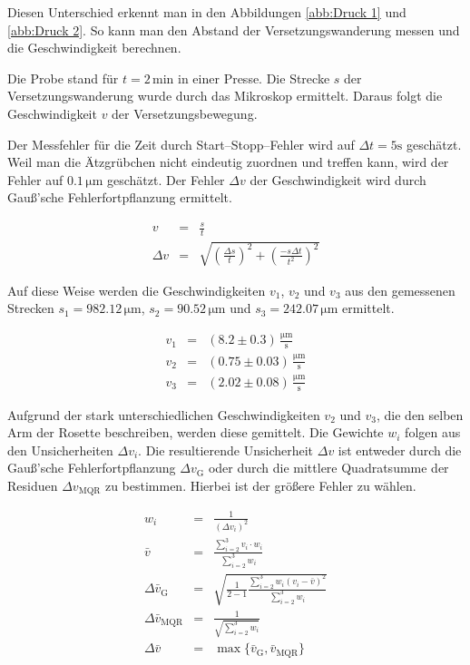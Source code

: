\documentclass[12pt,a4paper]{scrartcl}
\numberwithin{equation}{section} %
\begin{document}
Diesen Unterschied erkennt man in den Abbildungen \ref{abb:Druck 1} und \ref{abb:Druck 2}. So kann man den Abstand der Versetzungswanderung messen und die Geschwindigkeit berechnen.

Die Probe stand für $t=2\mathrm{\,min}$ in einer Presse. Die Strecke $s$ der Versetzungswanderung wurde durch das Mikroskop ermittelt. Daraus folgt die Geschwindigkeit $v$ der Versetzungsbewegung.

Der Messfehler für die Zeit durch Start--Stopp--Fehler wird auf $\Delta t=5\mathrm s$ geschätzt. Weil man die Ätzgrübchen nicht eindeutig zuordnen und treffen kann, wird der Fehler auf $0.1\mathrm{\,\mu m}$ geschätzt. Der Fehler $\Delta v$ der Geschwindigkeit wird durch Gauß'sche Fehlerfortpflanzung ermittelt.

\begin{eqnarray}
    v &=& \frac{s}{t} \\
    \Delta v &=&
        \sqrt{
            \left(\frac{\Delta s}{t}\right)^2
            + \left(\frac{-s \Delta t}{t^2}\right)^2
        }
\end{eqnarray}

\noindent
Auf diese Weise werden die Geschwindigkeiten $v_1$, $v_2$ und $v_3$ aus den gemessenen Strecken $s_1=982.12\mathrm{\,\mu m}$, $s_2=90.52\mathrm{\,\mu m}$ und $s_3=242.07\mathrm{\,\mu m}$ ermittelt.

\begin{eqnarray}
    v_1 &=& (8.2 \pm 0.3) \mathrm{\,\frac{\mu m}{s}} \\
    v_2 &=& (0.75 \pm 0.03) \mathrm{\,\frac{\mu m}{s}} \\
    v_3 &=& (2.02 \pm 0.08) \mathrm{\,\frac{\mu m}{s}}
\end{eqnarray}

\noindent
Aufgrund der stark unterschiedlichen Geschwindigkeiten $v_2$ und $v_3$, die den selben Arm der Rosette beschreiben, werden diese gemittelt. Die Gewichte $w_i$ folgen aus den Unsicherheiten $\Delta v_i$. Die resultierende Unsicherheit $\Delta v$ ist entweder durch die Gauß'sche Fehlerfortpflanzung $\Delta v_\mathrm{G}$ oder durch die mittlere Quadratsumme der Residuen $\Delta v_\mathrm{MQR}$ zu bestimmen. Hierbei ist der größere Fehler zu wählen.

\begin{eqnarray}
    w_i &=& \frac{1}{(\Delta v_i)^2} \\
    \bar{v} &=& \frac{\sum_{i=2}^{3} v_i\cdot w_i}{\sum_{i=2}^{3} w_i} \\
    \Delta \bar{v}_\mathrm{G} &=&
        \sqrt{\frac{1}{2-1}\frac{\sum_{i=2}^{3}w_i(v_i-\bar{v})^2}{\sum_{i=2}^{3}w_i}} \\
    \Delta \bar{v}_\mathrm{MQR} & = & \frac{1}{\sqrt{\sum_{i=2}^{3}w_i}} \\
    \Delta \bar{v} &=& \max\{\bar{v}_\mathrm{G}, \bar{v}_\mathrm{MQR}\}
\end{eqnarray}
\end{document}
